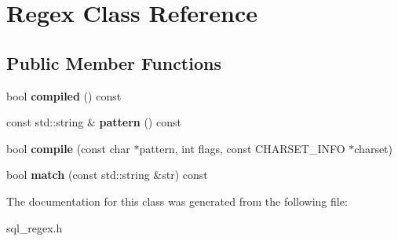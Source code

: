 \hypertarget{classRegex}{}\section{Regex Class Reference}
\label{classRegex}
\subsection*{Public Member Functions}
\begin{DoxyCompactItemize}
\item 
\mbox{\label{classRegex_ad0c95e5aeb978d46580c718cada3daee}} 
bool {\bfseries compiled} () const
\item 
\mbox{\label{classRegex_abb3cfbab10ee651c5e5ed04bd9561432}} 
const std\+::string \& {\bfseries pattern} () const
\item 
\mbox{\label{classRegex_addbcd1508aabe9f0dbcd06298e87e8e4}} 
bool {\bfseries compile} (const char $\ast$pattern, int flags, const C\+H\+A\+R\+S\+E\+T\+\_\+\+I\+N\+FO $\ast$charset)
\item 
\mbox{\label{classRegex_a236353f6574fd3601e723bd94722834d}} 
bool {\bfseries match} (const std\+::string \&str) const
\end{DoxyCompactItemize}


The documentation for this class was generated from the following file\+:\begin{DoxyCompactItemize}
\item 
sql\+\_\+regex.\+h\end{DoxyCompactItemize}
